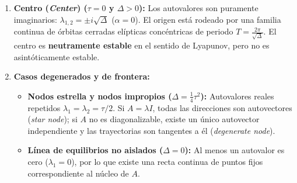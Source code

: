 \begin{definition}
\begin{enumerate}
    \item \textbf{Centro (\emph{Center}) ($\tau = 0$ y $\Delta > 0$):}
    Los autovalores son puramente imaginarios: $\lambda_{1,2} = \pm i\sqrt{\Delta}$ ($\alpha = 0$). El origen está rodeado por una familia continua de órbitas cerradas elípticas concéntricas de periodo $T = \frac{2\pi}{\sqrt{\Delta}}$. El centro es \textbf{neutramente estable} en el sentido de Lyapunov, pero no es asintóticamente estable.

    \item \textbf{Casos degenerados y de frontera:}
    \begin{itemize}
        \item \textbf{Nodos estrella y nodos impropios ($\Delta = \frac{1}{4}\tau^2$):} Autovalores reales repetidos $\lambda_1 = \lambda_2 = \tau/2$. Si $A = \lambda I$, todas las direcciones son autovectores (\emph{star node}); si $A$ no es diagonalizable, existe un único autovector independiente y las trayectorias son tangentes a él (\emph{degenerate node}).
        \item \textbf{Línea de equilibrios no aislados ($\Delta = 0$):} Al menos un autovalor es cero ($\lambda_1 = 0$), por lo que existe una recta continua de puntos fijos correspondiente al núcleo de $A$.
    \end{itemize}
\end{enumerate}
\end{definition}

